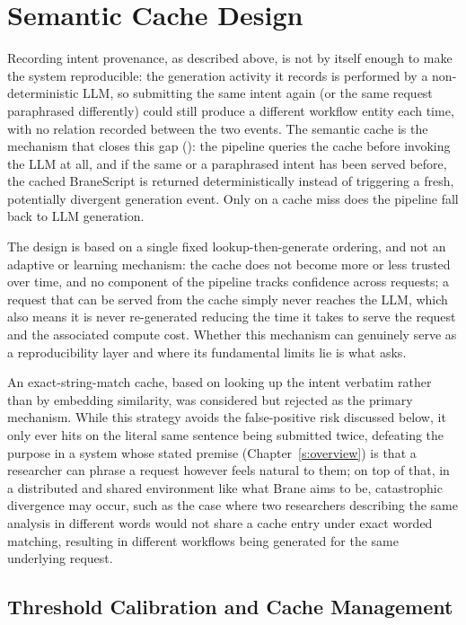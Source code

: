 \section{Semantic Cache Design}\label{s:semantic-cache-design}

Recording intent provenance, as described above, is not by itself enough to
make the system reproducible: the generation activity it records is
performed by a non-deterministic LLM, so submitting the same intent again
(or the same request paraphrased differently) could still produce a
different workflow entity each time, with no relation recorded between the
two events. The semantic cache is the mechanism that closes this gap (): the pipeline
queries the cache before invoking the LLM at all, and if the same or a
paraphrased intent has been served before, the cached BraneScript is
returned deterministically instead of triggering a fresh, potentially
divergent generation event. Only on a cache miss does the pipeline fall back
to LLM generation. 

The design is based on a single fixed lookup-then-generate ordering, and
not an adaptive or learning mechanism: the cache does not become more or less
trusted over time, and no component of the pipeline tracks confidence across
requests; a request that can be served from the cache simply never reaches
the LLM, which also means it is never re-generated reducing the time it 
takes to serve the request and the associated compute cost. Whether this
mechanism can genuinely serve as a reproducibility layer and where its
fundamental limits lie is what  asks.

An exact-string-match cache, based on looking up the intent verbatim rather than by
embedding similarity, was considered but rejected as the primary mechanism.
While this strategy avoids the false-positive risk discussed below, 
it only ever hits on the literal same sentence being submitted 
twice, defeating the purpose in a system whose stated premise (Chapter~\ref{s:overview})
is that a researcher can phrase a request however feels natural to them; on top of that,
in a distributed and shared environment like what Brane aims to be, catastrophic divergence
may occur, such as the case where two researchers describing the same analysis 
in different words would not share a cache entry under exact worded matching, resulting
in different workflows being generated for the same underlying request.


\subsection{Threshold Calibration and Cache Management}\label{ss:threshold-calibration}

